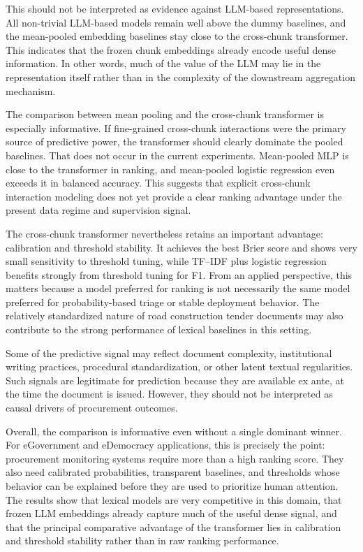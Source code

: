 \documentclass[conference]{IEEEtran}
\begin{document}
This should not be interpreted as evidence against LLM-based representations. All non-trivial LLM-based models remain well above the dummy baselines, and the mean-pooled embedding baselines stay close to the cross-chunk transformer. This indicates that the frozen chunk embeddings already encode useful dense information. In other words, much of the value of the LLM may lie in the representation itself rather than in the complexity of the downstream aggregation mechanism.

The comparison between mean pooling and the cross-chunk transformer is especially informative. If fine-grained cross-chunk interactions were the primary source of predictive power, the transformer should clearly dominate the pooled baselines. That does not occur in the current experiments. Mean-pooled MLP is close to the transformer in ranking, and mean-pooled logistic regression even exceeds it in balanced accuracy. This suggests that explicit cross-chunk interaction modeling does not yet provide a clear ranking advantage under the present data regime and supervision signal.

The cross-chunk transformer nevertheless retains an important advantage: calibration and threshold stability. It achieves the best Brier score and shows very small sensitivity to threshold tuning, while TF--IDF plus logistic regression benefits strongly from threshold tuning for F1. From an applied perspective, this matters because a model preferred for ranking is not necessarily the same model preferred for probability-based triage or stable deployment behavior. The relatively standardized nature of road construction tender documents may also contribute to the strong performance of lexical baselines in this setting.

Some of the predictive signal may reflect document complexity, institutional writing practices, procedural standardization, or other latent textual regularities. Such signals are legitimate for prediction because they are available ex ante, at the time the document is issued. However, they should not be interpreted as causal drivers of procurement outcomes.

Overall, the comparison is informative even without a single dominant winner. For eGovernment and eDemocracy applications, this is precisely the point: procurement monitoring systems require more than a high ranking score. They also need calibrated probabilities, transparent baselines, and thresholds whose behavior can be explained before they are used to prioritize human attention. The results show that lexical models are very competitive in this domain, that frozen LLM embeddings already capture much of the useful dense signal, and that the principal comparative advantage of the transformer lies in calibration and threshold stability rather than in raw ranking performance.
\end{document}
